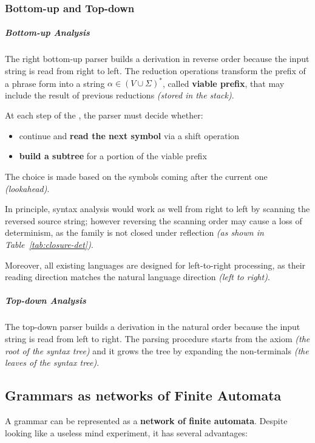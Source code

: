 \documentclass[english]{article}
\begin{document}
\subsubsection{Bottom-up and Top-down }

\subparagraph*{Bottom-up Analysis}
The right bottom-up parser builds a derivation in reverse order because the input string is read from right to left.
The reduction operations transform the prefix of a phrase form into a string \(\alpha \in \left( V \cup \Sigma \right)^\ast\), called \textbf{viable prefix}, that may include the result of previous reductions \textit{(stored in the stack)}.

At each step of the , the parser must decide whether:

\begin{itemize}
  \item continue and \textbf{read the next symbol} via a shift operation
  \item \textbf{build a subtree} for a portion of the viable prefix
\end{itemize}

The choice is made based on the symbols coming after the current one \textit{(lookahead)}.

\bigskip
In principle, syntax analysis would work as well from right to left by scanning the reversed source string;
however reversing the scanning order may cause a loss of determinism, as the \DET family is not closed under reflection \textit{(as shown in Table~\ref{tab:closure-det})}.

Moreover, all existing languages are designed for left-to-right processing, as their reading direction matches the natural language direction \textit{(left to right)}.

\subparagraph*{Top-down Analysis}
The top-down parser builds a derivation in the natural order because the input string is read from left to right.
The parsing procedure starts from the axiom \textit{(the root of the syntax tree)} and it grows the tree by expanding the non-terminals \textit{(the leaves of the syntax tree)}.

\subsection{Grammars as networks of Finite Automata}

A grammar can be represented as a \textbf{network of finite automata}.
Despite looking like a useless mind experiment, it has several advantages:
\end{document}
